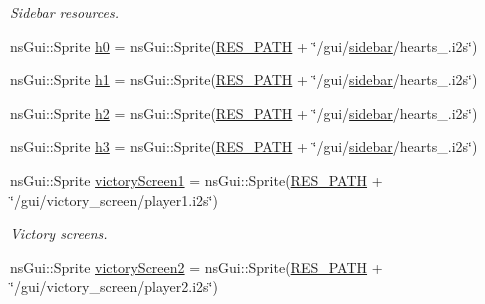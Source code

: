 \begin{DoxyCompactItemize}
\begin{DoxyCompactList}\small\item\em Sidebar resources. \end{DoxyCompactList}\item 
ns\+Gui\+::\+Sprite \hyperlink{classns_game_1_1_game_state_afaac1bf595eef244503f5b15917e230d}{h0} = ns\+Gui\+::\+Sprite(\hyperlink{definitions_8h_a793644bd88146828177a2a4f57e3bf01}{R\+E\+S\+\_\+\+P\+A\+TH} + \char`\"{}/gui/\hyperlink{classns_game_1_1_game_state_a144f7f71a2a43f8422a346e4bc9bb923}{sidebar}/hearts\+\_.\+i2s\char`\"{})
\item 
ns\+Gui\+::\+Sprite \hyperlink{classns_game_1_1_game_state_a7d9cc08964a619c0f72a7000fe7f511c}{h1} = ns\+Gui\+::\+Sprite(\hyperlink{definitions_8h_a793644bd88146828177a2a4f57e3bf01}{R\+E\+S\+\_\+\+P\+A\+TH} + \char`\"{}/gui/\hyperlink{classns_game_1_1_game_state_a144f7f71a2a43f8422a346e4bc9bb923}{sidebar}/hearts\+\_.\+i2s\char`\"{})
\item 
ns\+Gui\+::\+Sprite \hyperlink{classns_game_1_1_game_state_a1fbc7862058993d3ff53db6f50d3949d}{h2} = ns\+Gui\+::\+Sprite(\hyperlink{definitions_8h_a793644bd88146828177a2a4f57e3bf01}{R\+E\+S\+\_\+\+P\+A\+TH} + \char`\"{}/gui/\hyperlink{classns_game_1_1_game_state_a144f7f71a2a43f8422a346e4bc9bb923}{sidebar}/hearts\+\_.\+i2s\char`\"{})
\item 
ns\+Gui\+::\+Sprite \hyperlink{classns_game_1_1_game_state_a421981b496870032de67b556f80ed1c9}{h3} = ns\+Gui\+::\+Sprite(\hyperlink{definitions_8h_a793644bd88146828177a2a4f57e3bf01}{R\+E\+S\+\_\+\+P\+A\+TH} + \char`\"{}/gui/\hyperlink{classns_game_1_1_game_state_a144f7f71a2a43f8422a346e4bc9bb923}{sidebar}/hearts\+\_.\+i2s\char`\"{})
\item 
ns\+Gui\+::\+Sprite \hyperlink{classns_game_1_1_game_state_a23ea4a0acc9d2f56f9c324ccfa6560ec}{victory\+Screen1} = ns\+Gui\+::\+Sprite(\hyperlink{definitions_8h_a793644bd88146828177a2a4f57e3bf01}{R\+E\+S\+\_\+\+P\+A\+TH} + \char`\"{}/gui/victory\+\_\+screen/player1.\+i2s\char`\"{})
\begin{DoxyCompactList}\small\item\em Victory screens. \end{DoxyCompactList}\item 
ns\+Gui\+::\+Sprite \hyperlink{classns_game_1_1_game_state_ab94cabb5a2665d1afc31937b84880b6e}{victory\+Screen2} = ns\+Gui\+::\+Sprite(\hyperlink{definitions_8h_a793644bd88146828177a2a4f57e3bf01}{R\+E\+S\+\_\+\+P\+A\+TH} + \char`\"{}/gui/victory\+\_\+screen/player2.\+i2s\char`\"{})
\item 

\end{DoxyCompactItemize}
